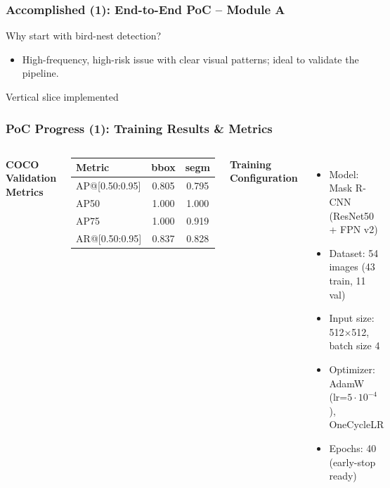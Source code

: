 \documentclass[aspectratio=169]{beamer}
\begin{document}
\begin{frame}
\frametitle{Accomplished (1): End-to-End PoC -- Module A}
\vspace{-5pt}
\begin{block}{Why start with bird-nest detection?}
\begin{itemize}
  \item High-frequency, high-risk issue with clear visual patterns; ideal to validate the pipeline.
\end{itemize}
\end{block}
\begin{block}{Vertical slice implemented}
\centering
\footnotesize
{}
\end{block}
\end{frame}

\begin{frame}
\frametitle{PoC Progress (1): Training Results \& Metrics}
\vspace{-5pt}
\begin{columns}
\textbf{COCO Validation Metrics}
\small
\begin{center}
\begin{tabular}{lcc}
\toprule
Metric & \textbf{bbox} & \textbf{segm} \\
\midrule
AP@[0.50:0.95] & 0.805 & 0.795 \\
AP50 & 1.000 & 1.000 \\
AP75 & 1.000 & 0.919 \\
AR@[0.50:0.95] & 0.837 & 0.828 \\
\bottomrule
\end{tabular}
\end{center}

\textbf{Training Configuration}
\begin{itemize}
  \item Model: Mask R-CNN (ResNet50 + FPN v2)
  \item Dataset: 54 images (43 train, 11 val)
  \item Input size: 512$\times$512, batch size 4
  \item Optimizer: AdamW (lr=$5\cdot10^{-4}$), OneCycleLR
  \item Epochs: 40 (early-stop ready)
\end{itemize}
\end{columns}
\end{frame}
\end{document}
